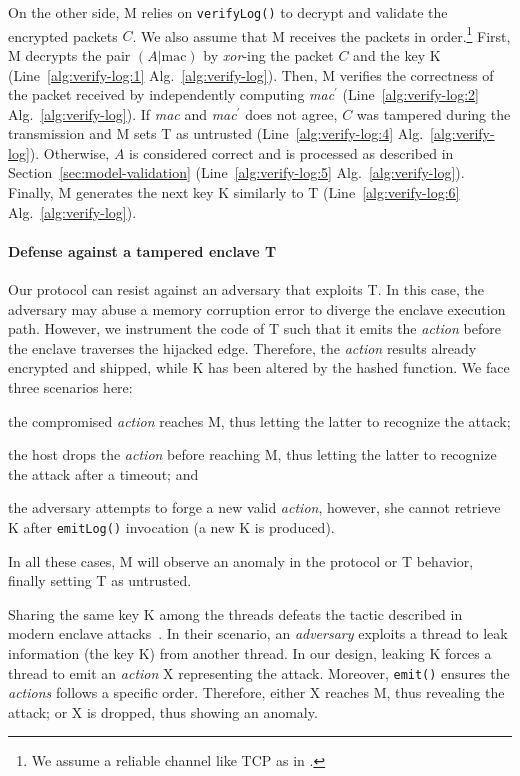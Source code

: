 On the other side, M relies on \texttt{verifyLog()} to decrypt and validate the 
encrypted packets $C$.
We also assume that M receives the packets in 
order.\footnote{We assume a reliable channel like TCP as in \cite{scarr}.}
First, M decrypts the pair $(A|\text{mac})$ by \emph{xor}-ing the packet $C$ 
and the key K (Line~\ref{alg:verify-log:1} Alg.~\ref{alg:verify-log}).
Then, M verifies the correctness of the packet received by independently 
computing \emph{mac}$^\prime$ (Line~\ref{alg:verify-log:2} 
Alg.~\ref{alg:verify-log}).
If \emph{mac} and \emph{mac}$^\prime$ does not agree, $C$ was tampered during 
the transmission and M sets T as untrusted (Line~\ref{alg:verify-log:4} 
Alg.~\ref{alg:verify-log}).
Otherwise, $A$ is considered correct and is processed as described in 
Section~\ref{sec:model-validation} (Line~\ref{alg:verify-log:5}  
Alg.~\ref{alg:verify-log}).
Finally, M generates the next key K similarly to T 
(Line~\ref{alg:verify-log:6} Alg.~\ref{alg:verify-log}).

\paragraph{Defense against a tampered enclave T}
Our protocol can resist against an adversary that exploits T.
In this case, the adversary may abuse a memory corruption error to 
diverge the enclave execution path.
However, we instrument the code of T such that it emits the \emph{action} 
before the enclave traverses the hijacked edge.
Therefore, the \emph{action} results already encrypted and shipped, while K has 
been altered by the hashed function.
We face three scenarios here:
\begin{enumerate*}[label=(S\arabic*)]
	\item the compromised \emph{action} reaches M, thus letting the
	latter to recognize the attack;
	\item the host drops the \emph{action} before reaching M, thus letting the 
	latter to recognize the attack after a timeout; and
	\item the adversary attempts to forge a new valid \emph{action}, however, 
	she cannot retrieve K after \texttt{emitLog()} invocation (\ie a new K is 
	produced).
\end{enumerate*}
In all these cases, M will observe an anomaly in the protocol or T 
behavior, finally setting T as untrusted.

Sharing the same key K among the threads defeats the tactic described 
in modern enclave attacks~\citep{lee2017hacking}.
In their scenario, an \emph{adversary} exploits a thread
to leak information (\ie the key K) from another thread.
In our design, leaking K forces a thread to emit an \emph{action} X 
representing the attack. Moreover, \texttt{emit()} ensures the \emph{actions} 
follows a specific order. 
Therefore, either X reaches M, thus revealing the attack; or X is 
dropped, thus showing an anomaly.

